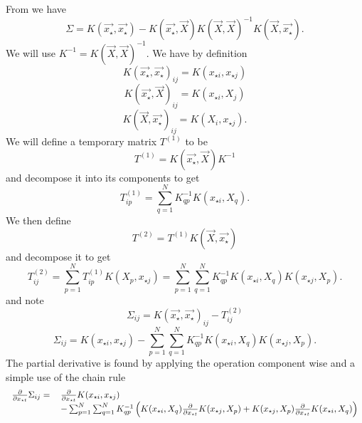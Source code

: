 From \cite{RW} we have
\begin{equation}
 \Sigma = K(\vec{x_{\star}}, \vec{x_{\star}}) - K(\vec{x_{\star}}, \vec{X}) K(\vec{X}, \vec{X})^{-1} K(\vec{X}, \vec{x_{\star}}).
\end{equation}
We will use $K^{-1} = K(\vec{X}, \vec{X})^{-1}$. We have by definition
\begin{equation}
 K(\vec{x_{\star}}, \vec{x_{\star}})_{ij} = K(x_{\star i}, x_{\star j})
\end{equation}
\begin{equation}
 K(\vec{x_{\star}}, \vec{X})_{ij} = K(x_{\star i}, X_{j})
\end{equation}
\begin{equation}
 K(\vec{X}, \vec{x_{\star}})_{ij} = K(X_{i}, x_{\star j}).
\end{equation}
We will define a temporary matrix $T^{(1)}$ to be
\begin{equation}
 T^{(1)} = K(\vec{x_{\star}}, \vec{X}) K^{-1}
\end{equation}
and decompose it into its components to get
\begin{equation}
 T^{(1)}_{ip} = \sum_{q = 1}^{N} K^{-1}_{qp} K(x_{\star i}, X_{q}).
\end{equation}
We then define
\begin{equation}
 T^{(2)} = T^{(1)} K(\vec{X}, \vec{x_{\star}})
\end{equation}
and decompose it to get
\begin{equation}
 T^{(2)}_{ij} = \sum_{p = 1}^{N} T^{(1)}_{ip} K(X_{p}, x_{\star j}) = \sum_{p = 1}^{N} \sum_{q = 1}^{N} K^{-1}_{qp} K(x_{\star i}, X_{q}) K(x_{\star j}, X_{p}).
\end{equation}
and note
\begin{equation}
 \Sigma_{ij} = K(\vec{x_{\star}}, \vec{x_{\star}})_{ij} - T^{(2)}_{ij}
\end{equation}
\begin{equation}
 \Sigma_{ij} = K(x_{\star i}, x_{\star j}) - \sum_{p = 1}^{N} \sum_{q = 1}^{N} K^{-1}_{qp} K(x_{\star i}, X_{q}) K(x_{\star j}, X_{p}).
\end{equation}
The partial derivative is found by applying the operation component wise and a simple use of the chain rule
\begin{equation}
 \begin{tabular}{rl}
 $\frac{\partial}{\partial x_{\star t}} \Sigma_{ij} =$ & $\frac{\partial}{\partial x_{\star t}} K(x_{\star i}, x_{\star j})$ \\
 & $- \sum_{p = 1}^{N} \sum_{q = 1}^{N} K^{-1}_{qp} \left( K(x_{\star i}, X_{q}) \frac{\partial}{\partial x_{\star t}} K(x_{\star j}, X_{p}) + K(x_{\star j}, X_{p}) \frac{\partial}{\partial x_{\star t}} K(x_{\star i}, X_{q}) \right)$
 \end{tabular}
\end{equation}
